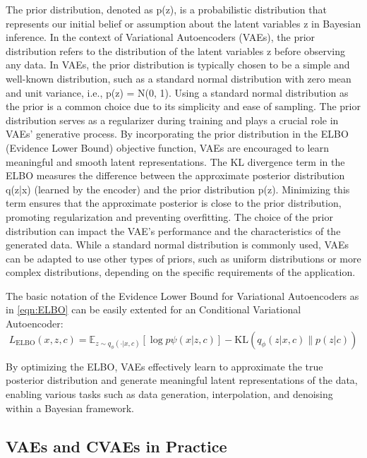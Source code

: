 The prior distribution, denoted as p(z), is a probabilistic distribution that represents our initial belief or assumption about the latent variables z in Bayesian inference. In the context of Variational Autoencoders (VAEs), the prior distribution refers to the distribution of the latent variables z before observing any data.
In VAEs, the prior distribution is typically chosen to be a simple and well-known distribution, such as a standard normal distribution with zero mean and unit variance, i.e., p(z) = N(0, 1). Using a standard normal distribution as the prior is a common choice due to its simplicity and ease of sampling.
The prior distribution serves as a regularizer during training and plays a crucial role in VAEs' generative process. By incorporating the prior distribution in the ELBO (Evidence Lower Bound) objective function, VAEs are encouraged to learn meaningful and smooth latent representations. The KL divergence term in the ELBO measures the difference between the approximate posterior distribution q(z|x) (learned by the encoder) and the prior distribution p(z). Minimizing this term ensures that the approximate posterior is close to the prior distribution, promoting regularization and preventing overfitting.
The choice of the prior distribution can impact the VAE's performance and the characteristics of the generated data. While a standard normal distribution is commonly used, VAEs can be adapted to use other types of priors, such as uniform distributions or more complex distributions, depending on the specific requirements of the application.
\fi

The basic notation of the Evidence Lower Bound for Variational Autoencoders as in \eqref{eqn:ELBO} can be easily extented for an Conditional Variational Autoencoder:
\begin{equation}\label{eqn:ELBO-CVAE}
	L_\text{ELBO}(x, z, c) = \mathbb{E}_{z\sim q_\phi(\cdot|x, c)} \left[ \log p\psi(x|z, c) \right] - \text{KL}\left( q_\phi(z|x, c) \| p(z|c) \right)
\end{equation}


By optimizing the ELBO, VAEs effectively learn to approximate the true posterior distribution and generate meaningful latent representations of the data, enabling various tasks such as data generation, interpolation, and denoising within a Bayesian framework.

\subsection{VAEs and CVAEs in Practice}

